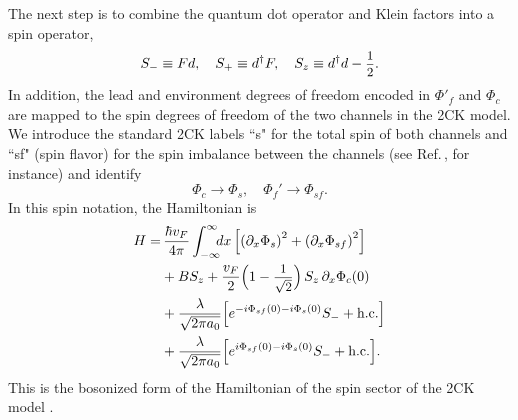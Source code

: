 \documentclass[aps,prb,reprint,floatfix,superscriptaddress,amssymb,amsmath]{revtex4-2}
\newcommand{\sdfrac}[2]{\mbox{\small$\displaystyle\frac{#1}{#2}$}}
\begin{document}
The next step 
is to combine the quantum dot operator and Klein factors into a spin operator, 
\begin{equation}
S_- \equiv Fd, \quad S_+ \equiv d^\dagger F, \quad S_z \equiv d^\dagger d - \sdfrac{1}{2}.
\label{eq:effective_spin}
\end{equation}
In addition, the lead and environment degrees of freedom encoded in $\Phi'_f$ and $\Phi_c$ are mapped to the spin degrees of freedom of the two channels in the 2CK model. We introduce the standard 2CK labels ``s" for the total spin of both channels and ``sf" (spin flavor) for the spin imbalance between the channels (see Ref.\,\cite{SchillerHershToulousePRB98}, for instance) and identify
\begin{equation}
\Phi_c \to \Phi_{s}, \quad \Phi_f' \to \Phi_{sf}. 
\end{equation}
In this spin notation, the Hamiltonian is 
\begin{align}
H =&\, \frac{\hbar v_{F}}{4\pi}\int_{-\infty}^{\infty} \!\!\!dx
 \left[\left(\partial_{x}\Phi_{s}\right)^{2}+\left(\partial_{x}\Phi_{sf}\right)^{2}\right] \notag \\
& + BS_z + \frac{v_F}{2} \Big(1-\sdfrac{1}{\sqrt{2}}\Big)\, S_z \, \partial_x \Phi_c(0) 
\notag\\
& + \frac{\lambda}{\sqrt{2\pi a_0}}\Big[ e^{-i  \Phi_{sf}(0) - i\Phi_s(0)} S_- +  \text{h.c.} \Big] 
\label{eq:map_2ck_after}\\
& + \frac{\lambda}{\sqrt{2\pi a_0}}\Big[ e^{  i \Phi_{sf}(0) - i \Phi_s(0)} S_- + \text{h.c.} \Big] . \notag
\end{align}
This is the bosonized form of the Hamiltonian of the spin sector of the 2CK model \cite{GogolinBook,SchillerHershToulousePRB98}.
\end{document}
